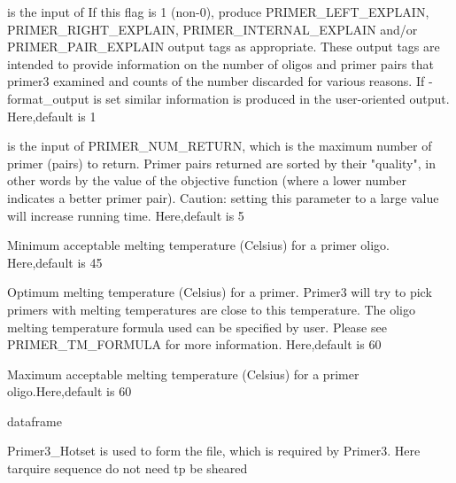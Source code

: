 \documentclass[a4paper]{book}
\begin{document}
\begin{Arguments}
\begin{ldescription}
\item[\code{explain\_fiag}] is the input of If this flag is 1 (non-0), produce PRIMER\_LEFT\_EXPLAIN,
PRIMER\_RIGHT\_EXPLAIN, PRIMER\_INTERNAL\_EXPLAIN and/or PRIMER\_PAIR\_EXPLAIN output tags
as appropriate. These output tags are intended to provide information on the number
of oligos and primer pairs that primer3 examined and counts of the number discarded
for various reasons. If -format\_output is set similar information is produced in the
user-oriented output. Here,default is 1

\item[\code{return}] is the input of PRIMER\_NUM\_RETURN, which is the maximum number of primer (pairs) to return. Primer pairs
returned are sorted by their "quality", in other words by the value of the objective function
(where a lower number indicates a better primer pair). Caution: setting this parameter to a
large value will increase running time. Here,default is 5

\item[\code{min\_tm}] Minimum acceptable melting temperature (Celsius) for a primer oligo. Here,default is 45

\item[\code{opt\_tm}] Optimum melting temperature (Celsius) for a primer. Primer3 will try
to pick primers with melting temperatures are close to this temperature. The oligo
melting temperature formula used can be specified by user. Please see PRIMER\_TM\_FORMULA
for more information. Here,default is 60

\item[\code{max\_tm}] Maximum acceptable melting temperature (Celsius) for a primer oligo.Here,default is 60
\end{ldescription}
\end{Arguments}
%
\begin{Value}
dataframe
\end{Value}
%
\begin{Examples}
\end{Examples}
%
\begin{Description}\relax
Primer3\_Hotset is used to form the file, which is required by Primer3. Here tarquire sequence
do not need tp be sheared
\end{Description}
\end{document}
